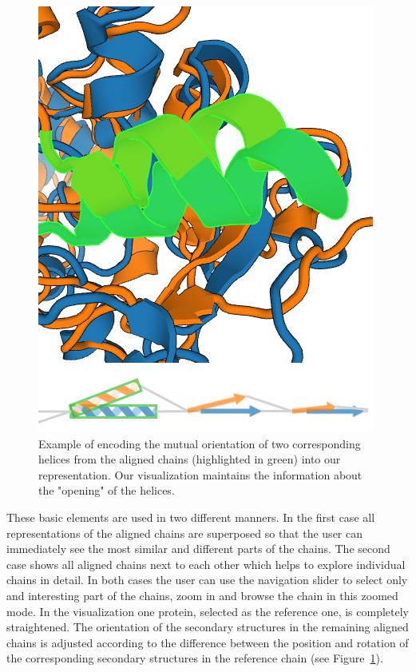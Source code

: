 \documentclass[twocolumn]{bmcart}%
\begin{document}
\begin{figure}[th]
  \centering
  \includegraphics[width=0.9\linewidth]{pics/orientation.png}
  \caption{Example of encoding the mutual orientation of two corresponding helices from the aligned chains (highlighted in green) into our representation. Our visualization maintains the information about the "opening" of the helices.}
  \label{fig:orientation}
\end{figure}

These basic elements are used in two different manners.
In the first case all representations of the aligned chains are superposed so that the user can immediately see the most similar and different parts of the chains.
The second case shows all aligned chains next to each other which helps to explore individual chains in detail.
In both cases the user can use the navigation slider to select only and interesting part of the chains, zoom in and browse the chain in this zoomed mode.
In the visualization one protein, selected as the reference one, is completely straightened.
The orientation of the secondary structures in the remaining aligned chains is adjusted according to the difference between the position and rotation of the corresponding secondary structures in the reference chain (see Figure~\ref{fig:orientation}).
\end{document}
